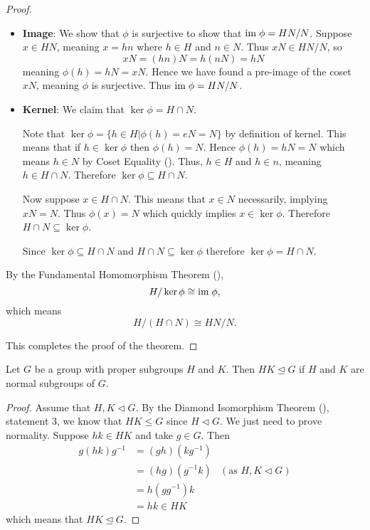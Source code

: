 \begin{proof}
\begin{enumerate}
\begin{itemize}
            \item \textbf{Image}: We show that $\phi$ is surjective to show that $\mathrm{im}\;\phi = HN/N$. Suppose $x \in HN$, meaning $x = hn$ where $h \in H$ and $n \in N$. Thus $xN \in HN/N$, so
            \[
                xN = (hn)N = h(nN) = hN
            \]
            meaning $\phi(h) = hN = xN$. Hence we have found a pre-image of the coset $xN$, meaning $\phi$ is surjective. Thus $\mathrm{im}\; \phi = HN/N$.

            \item \textbf{Kernel}: We claim that $\ker\phi = H \cap N$.
            
            Note that $\ker\phi = \{h \in H \vert \phi(h) = eN = N\}$ by definition of kernel. This means that if $h \in \ker\phi$ then $\phi(h) = N$. Hence $\phi(h) = hN = N$ which means $h \in N$ by Coset Equality (). Thus, $h \in H$ and $h \in n$, meaning $h \in H \cap N$. Therefore $\ker \phi \subseteq H \cap N$.
    
            Now suppose $x \in H \cap N$. This means that $x \in N$ necessarily, implying $xN = N$. Thus $\phi(x) = N$ which quickly implies $x \in \ker\phi$. Therefore $H \cap N \subseteq \ker\phi$.
    
            Since $\ker \phi \subseteq H \cap N$ and  $H \cap N \subseteq \ker\phi$ therefore $\ker\phi = H\cap N$.
        \end{itemize}

        By the Fundamental Homomorphism Theorem (),
        \[
            H / \ker\phi \cong \mathrm{im}\; \phi,
        \]
        which means
        \[
            H/(H\cap N) \cong HN/N.
        \]
    \end{enumerate}
    This completes the proof of the theorem.
\end{proof}

\begin{corollary}\label{corollary-subgroup-product-is-normal-subgroup-if-subgroups-are-normal}
    Let $G$ be a group with proper subgroups $H$ and $K$. Then $HK \unlhd G$ if $H$ and $K$ are normal subgroups of $G$.
\end{corollary}
\begin{proof}
    Assume that $H, K \lhd G$. By the Diamond Isomorphism Theorem (), statement 3, we know that $HK \leq G$ since $H \lhd G$. We just need to prove normality. Suppose $hk \in HK$ and take $g \in G$. Then
    \begin{align*}
        g(hk)g^{-1} &= (gh)(kg^{-1})\\
        &= (hg)(g^{-1}k) & (\text{as } H, K \lhd G)\\
        &= h(gg^{-1})k\\
        &= hk \in HK
    \end{align*}
    which means that $HK \unlhd G$.
\end{proof}

